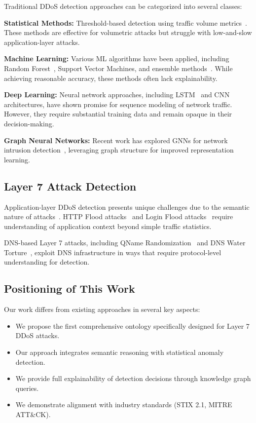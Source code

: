 \documentclass[preprint,12pt]{elsarticle}
\begin{document}
Traditional DDoS detection approaches can be categorized into several classes:

\textbf{Statistical Methods:} Threshold-based detection using traffic volume metrics~\cite{bhuyan2014survey}. These methods are effective for volumetric attacks but struggle with low-and-slow application-layer attacks.

\textbf{Machine Learning:} Various ML algorithms have been applied, including Random Forest~\cite{fernandes2019autonomous}, Support Vector Machines, and ensemble methods~\cite{kumar2019detection}. While achieving reasonable accuracy, these methods often lack explainability.

\textbf{Deep Learning:} Neural network approaches, including LSTM~\cite{li2020sdn} and CNN architectures, have shown promise for sequence modeling of network traffic. However, they require substantial training data and remain opaque in their decision-making.

\textbf{Graph Neural Networks:} Recent work has explored GNNs for network intrusion detection~\cite{lo2022graph}, leveraging graph structure for improved representation learning.

\subsection{Layer 7 Attack Detection}

Application-layer DDoS detection presents unique challenges due to the semantic nature of attacks~\cite{thapa2020application}. HTTP Flood attacks~\cite{raj2022detection} and Login Flood attacks~\cite{singh2020detection} require understanding of application context beyond simple traffic statistics.

DNS-based Layer 7 attacks, including QName Randomization~\cite{van2014dnssec} and DNS Water Torture~\cite{pappas2009impact}, exploit DNS infrastructure in ways that require protocol-level understanding for detection.

\subsection{Positioning of This Work}

Our work differs from existing approaches in several key aspects:

\begin{itemize}
    \item We propose the first comprehensive ontology specifically designed for Layer 7 DDoS attacks.
    \item Our approach integrates semantic reasoning with statistical anomaly detection.
    \item We provide full explainability of detection decisions through knowledge graph queries.
    \item We demonstrate alignment with industry standards (STIX 2.1, MITRE ATT\&CK).
\end{itemize}
\end{document}
